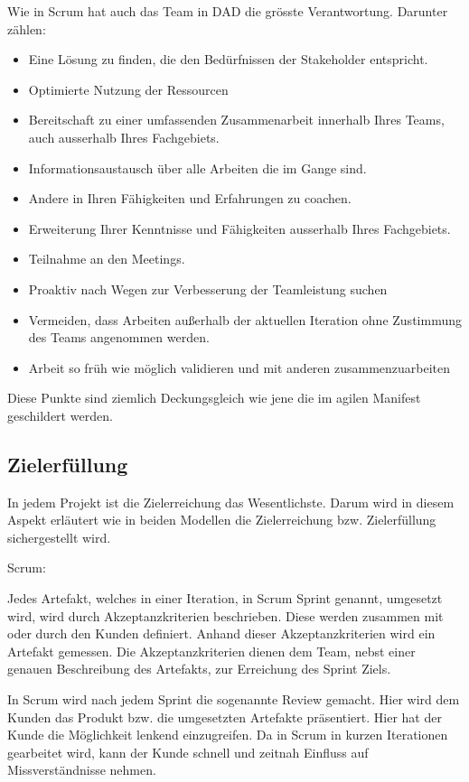 Wie in Scrum hat auch das Team in DAD die grösste Verantwortung. Darunter zählen:

\begin{itemize}
	\item Eine Lösung zu finden, die den Bedürfnissen der Stakeholder entspricht.
	\item Optimierte Nutzung der Ressourcen
	\item Bereitschaft zu einer umfassenden Zusammenarbeit innerhalb Ihres Teams, auch ausserhalb Ihres Fachgebiets.
	\item Informationsaustausch über alle Arbeiten die im Gange sind.
	\item Andere in Ihren Fähigkeiten und Erfahrungen zu coachen.
	\item Erweiterung Ihrer Kenntnisse und Fähigkeiten ausserhalb Ihres Fachgebiets.
	\item Teilnahme an den Meetings.
	\item Proaktiv nach Wegen zur Verbesserung der Teamleistung suchen
	\item Vermeiden, dass Arbeiten außerhalb der aktuellen Iteration ohne Zustimmung des Teams angenommen werden.
	\item Arbeit so früh wie möglich validieren und mit anderen zusammenzuarbeiten
\end{itemize}

Diese Punkte sind ziemlich Deckungsgleich wie jene die im agilen Manifest geschildert werden. 

\subsection{Zielerfüllung}

In jedem Projekt ist die Zielerreichung das Wesentlichste. Darum wird in diesem Aspekt erläutert wie in beiden Modellen die Zielerreichung bzw. Zielerfüllung sichergestellt wird.

\medskip
{\Large Scrum:} \medskip

Jedes Artefakt, welches in einer Iteration, in Scrum Sprint genannt, umgesetzt wird, wird durch Akzeptanzkriterien beschrieben. Diese werden zusammen mit oder durch den Kunden definiert. Anhand dieser Akzeptanzkriterien wird ein Artefakt gemessen. Die Akzeptanzkriterien dienen dem Team, nebst einer genauen Beschreibung des Artefakts, zur Erreichung des Sprint Ziels.

In Scrum wird nach jedem Sprint die sogenannte Review gemacht. Hier wird dem Kunden das Produkt bzw. die umgesetzten Artefakte präsentiert. Hier hat der Kunde die Möglichkeit lenkend einzugreifen. Da in Scrum in kurzen Iterationen gearbeitet wird, kann der Kunde schnell und zeitnah Einfluss auf Missverständnisse nehmen.

